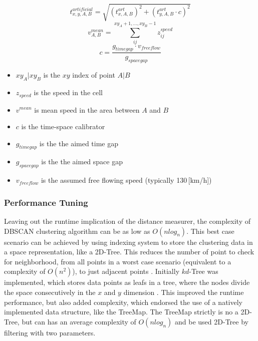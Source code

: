 \documentclass[a4paper,headsepline,footsepline,fontsize=11pt,BCOR=12mm,DIV=12]{report}
\begin{document}
\begin{equation}
	t_{x,y,A,B}^{artificial} = \sqrt{(t_{x,A,B}^{art})^2 + (t_{y,A,B}^{art} \cdot c)^2}
\end{equation}
\begin{equation}
	v_{A,B}^{mean} = \sum_{ij}^{xy_A + 1,...,xy_B - 1} z_{ij}^{speed}
\end{equation}
\begin{equation}
	c = \frac{g_{timegap} \cdot v_{freeflow}}{g_{spacegap}}
\end{equation}

\begin{itemize}
	\setlength\itemsep{0.1em}	
	\item[] $xy_A | xy_B$ is the $xy$ index of point $A | B$
	\item[] $z_{speed}$ is the speed in the cell
	\item[] $v^{mean}$ is mean speed in the area between $A$ and $B$
	\item[] $c$ is the time-space calibrator
	\item[] $g_{timegap}$ is the the aimed time gap
	\item[] $g_{spacegap}$ is the the aimed space gap
	\item[] $v_{freeflow}$ is the assumed free flowing speed (typically 130\,[km/h])
\end{itemize}


\subsubsection{Performance Tuning}
Leaving out the runtime implication of the distance measurer, the complexity of DBSCAN clustering algorithm can be as low as $O(nlog_n)$. This best case scenario can be achieved by using indexing system to store the clustering data in a space representation, like a 2D-Tree. This reduces the number of point to check for neighborhood, from all points in a worst case scenario (equivalent to a complexity of $O(n^2)$), to just adjacent points \cite{Chauhan2020}. Initially $kd$-Tree was implemented, which stores data points as leafs in a tree, where the nodes divide the space consecutively in the $x$ and $y$ dimension \cite{Hucker2020,Dalitz2009}. This improved the runtime performance, but also added complexity, which endorsed the use of a natively implemented data structure, like the TreeMap. The TreeMap strictly is no a 2D-Tree, but can has an average complexity of $O(nlog_n)$ and be used 2D-Tree by filtering with two parameters. \cite{Baeldung2020_1,Baeldung2020_2}
\end{document}
